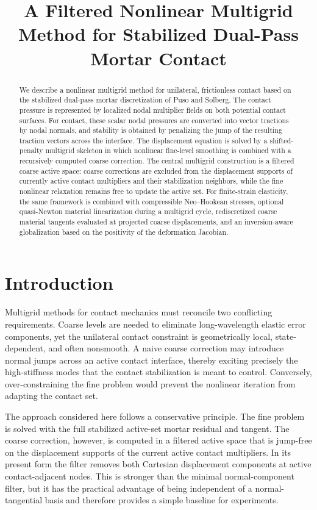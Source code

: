 \documentclass[11pt]{article}
\title{A Filtered Nonlinear Multigrid Method for Stabilized Dual-Pass Mortar Contact}
\author{}
\date{}
\begin{document}
\maketitle

\begin{abstract}
We describe a nonlinear multigrid method for unilateral, frictionless contact
based on the stabilized dual-pass mortar discretization of Puso and Solberg.
The contact pressure is represented by localized nodal multiplier fields on
both potential contact surfaces.  For contact, these scalar nodal pressures
are converted into vector tractions by nodal normals, and stability is obtained
by penalizing the jump of the resulting traction vectors across the interface.
The displacement equation is solved by a shifted-penalty multigrid skeleton in
which nonlinear fine-level smoothing is combined with a recursively computed
coarse correction.  The central multigrid construction is a filtered coarse
active space: coarse corrections are excluded from the displacement supports
of currently active contact multipliers and their stabilization neighbors,
while the fine nonlinear relaxation remains free to update the active set.
For finite-strain elasticity, the same framework is combined with compressible
Neo--Hookean stresses, optional quasi-Newton material linearization during a
multigrid cycle, rediscretized coarse material tangents evaluated at projected
coarse displacements, and an inversion-aware globalization based on the
positivity of the deformation Jacobian.
\end{abstract}

\section{Introduction}

Multigrid methods for contact mechanics must reconcile two conflicting
requirements.  Coarse levels are needed to eliminate long-wavelength elastic
error components, yet the unilateral contact constraint is geometrically local,
state-dependent, and often nonsmooth.  A naive coarse correction may introduce
normal jumps across an active contact interface, thereby exciting precisely
the high-stiffness modes that the contact stabilization is meant to control.
Conversely, over-constraining the fine problem would prevent the nonlinear
iteration from adapting the contact set.

The approach considered here follows a conservative principle.  The fine
problem is solved with the full stabilized active-set mortar residual and
tangent.  The coarse correction, however, is computed in a filtered active
space that is jump-free on the displacement supports of the current active
contact multipliers.  In its present form the filter removes both Cartesian
displacement components at active contact-adjacent nodes.  This is stronger
than the minimal normal-component filter, but it has the practical advantage
of being independent of a normal-tangential basis and therefore provides a
simple baseline for experiments.
\end{document}
